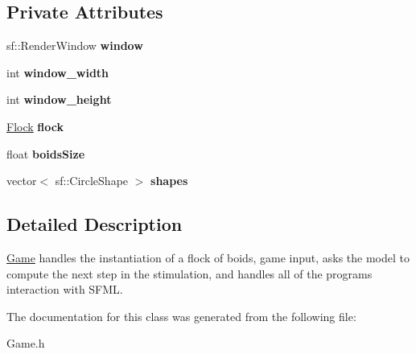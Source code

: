 \subsection*{Private Attributes}
\begin{DoxyCompactItemize}
\item 
sf\+::\+Render\+Window {\bfseries window}\hypertarget{class_game_a223de215aeb661cd423ac145756cc730}{}\label{class_game_a223de215aeb661cd423ac145756cc730}

\item 
int {\bfseries window\+\_\+width}\hypertarget{class_game_ad858cf9f4668f739c4556cd9fcc8a482}{}\label{class_game_ad858cf9f4668f739c4556cd9fcc8a482}

\item 
int {\bfseries window\+\_\+height}\hypertarget{class_game_ad81c3b9b3e2a80b6d27c84e4a9f4eb31}{}\label{class_game_ad81c3b9b3e2a80b6d27c84e4a9f4eb31}

\item 
\hyperlink{class_flock}{Flock} {\bfseries flock}\hypertarget{class_game_ad3e8ecf088a5e6abccd1b4fb5b6533a6}{}\label{class_game_ad3e8ecf088a5e6abccd1b4fb5b6533a6}

\item 
float {\bfseries boids\+Size}\hypertarget{class_game_a3e6bd091af7023583e28ca5d2b8f9ceb}{}\label{class_game_a3e6bd091af7023583e28ca5d2b8f9ceb}

\item 
vector$<$ sf\+::\+Circle\+Shape $>$ {\bfseries shapes}\hypertarget{class_game_abb3836ccb90742ca64267fec2fac57cb}{}\label{class_game_abb3836ccb90742ca64267fec2fac57cb}

\end{DoxyCompactItemize}


\subsection{Detailed Description}
\hyperlink{class_game}{Game} handles the instantiation of a flock of boids, game input, asks the model to compute the next step in the stimulation, and handles all of the program\textquotesingle{}s interaction with S\+F\+ML. 

The documentation for this class was generated from the following file\+:\begin{DoxyCompactItemize}
\item 
Game.\+h\end{DoxyCompactItemize}
